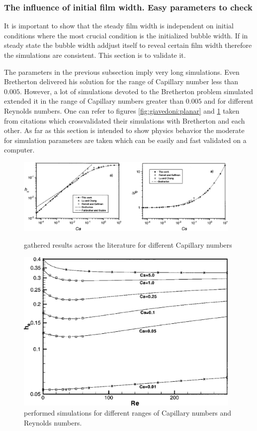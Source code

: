 \documentclass{article}
\begin{document}
\subsubsection{The influence of initial film width. Easy parameters to check}
It is important to show that the steady film width is independent on initial
conditions where the most crucial condition is the initialized bubble width. If
in steady state the bubble width addjust itself to reveal certain film width
therefore the simulations are consistent. This section is to validate it.

The parameters in the previous subsection imply very long simulations. Even
Bretherton delivered his solution for the range of Capillary number less than
$0.005$. However, a lot of simulations devoted to the Bretherton problem
simulated extended it in the range of Capillary numbers greater than $0.005$
and for different Reynolds numbers. One can refer to figures
\ref{fig:giavedoni:planar} and \ref{fig:heil:planar} taken from citations
\cite{giavedoni-numerical,heil-bretherton} which crossvalidated their
simulations with Bretherton and each other. As far as this section is intended
to show physics behavior the moderate for simulation parameters are taken which
can be easily and fast validated on a computer. 
\begin{figure}
\includegraphics[width=0.97\textwidth]{Figures/giavedoni_planar.eps}
\caption{\citet{giavedoni-numerical} gathered results across the
literature for different Capillary numbers \label{fig:giavedoni:planar}}
\includegraphics[width=0.97\textwidth]{Figures/heil-planar.eps}
\caption{\citet{heil-bretherton} performed simulations for different ranges of
Capillary numbers and Reynolds numbers. \label{fig:heil:planar}}
\end{figure}
\end{document}
